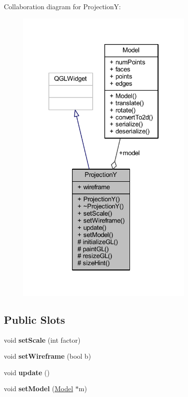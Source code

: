 Collaboration diagram for ProjectionY\+:
\nopagebreak
\begin{figure}[H]
\begin{center}
\leavevmode
\includegraphics[width=250pt]{class_projection_y__coll__graph}
\end{center}
\end{figure}
\subsection*{Public Slots}
\begin{DoxyCompactItemize}
\item 
\mbox{\label{class_projection_y_a19960a2d4075443ab87fd50147fee276}} 
void {\bfseries set\+Scale} (int factor)
\item 
\mbox{\label{class_projection_y_ab59d0f6245e889c25faf1d0592145d6c}} 
void {\bfseries set\+Wireframe} (bool b)
\item 
\mbox{\label{class_projection_y_a3c709da38e36be432cdc3979cf37d527}} 
void {\bfseries update} ()
\item 
\mbox{\label{class_projection_y_a66e7b460c9bb0c02b649a241d3b9a647}} 
void {\bfseries set\+Model} (\mbox{\hyperlink{class_model}{Model}} $\ast$m)
\end{DoxyCompactItemize}
